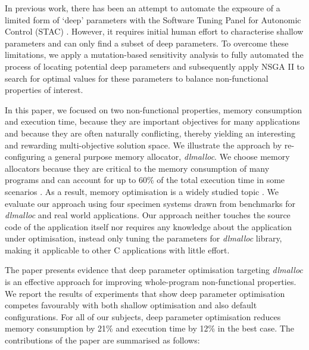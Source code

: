 In previous work, there has been an attempt to automate the expsoure of a limited form of `deep' parameters with the Software Tuning Panel for Autonomic Control (STAC) \cite{Brake:2008:ADS:1370018.1370031}. However, it requires initial human effort to characterise shallow parameters and can only find a subset of deep parameters. To overcome these limitations, we apply a mutation-based sensitivity analysis to fully automated the process of locating potential deep parameters and subsequently apply NSGA II to search for optimal values for these parameters to balance non-functional properties of interest. 

In this paper, we focused on two non-functional properties, memory consumption and execution time, because they are important objectives for many applications and because they are often naturally conflicting, thereby yielding an interesting and rewarding multi-objective solution space. We illustrate the approach by re-configuring a general purpose memory allocator, \emph{dlmalloc}. We choose memory allocators because they are critical to the memory consumption of many programs and can account for up to 60\% of the total execution time in some scenarios \cite{Zorn:1992:EMS:142181.142200}. As a result, memory optimisation is a widely studied topic \cite{Risco-Martin:2009:ODM:1569901.1570116,RiscoMartin2010572}. We evaluate our approach using four specimen systems drawn from benchmarks for \emph{dlmalloc} and real world applications. Our approach neither touches the source code of the application itself nor requires any knowledge about the application under optimisation, instead only tuning the parameters for \emph{dlmalloc} library, making it applicable to other C applications with little effort.


The paper presents evidence that deep parameter optimisation targeting \emph{dlmalloc} is an effective approach for improving whole-program non-functional properties. 
We report the results of experiments that show deep parameter optimisation competes favourably with both shallow optimisation and also default configurations. For all of our subjects, deep parameter optimisation reduces memory consumption by 21\% and execution time by 12\% in the best case. The contributions of the paper are summarised as follows:


